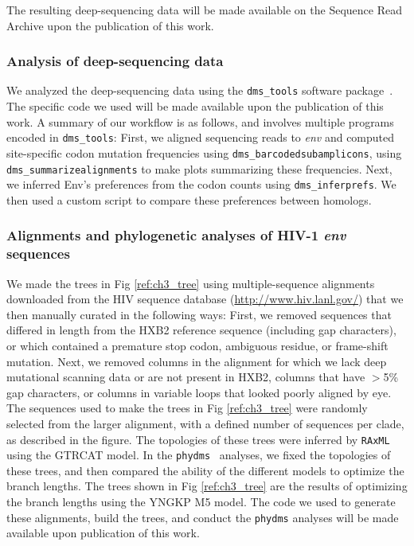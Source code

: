 \documentclass[9pt]{elife}
\begin{document}
The resulting deep-sequencing data will be made available on the Sequence Read Archive upon the publication of this work.

\subsubsection*{Analysis of deep-sequencing data}

We analyzed the deep-sequencing data using the \texttt{dms\_tools} software package~\cite{bloom2015software}.
The specific code we used will be made available upon the publication of this work.
A summary of our workflow is as follows, and involves multiple programs encoded in \texttt{dms\_tools}:
First, we aligned sequencing reads to \textit{env} and computed site-specific codon mutation frequencies using \texttt{dms\_barcodedsubamplicons}, using \texttt{dms\_summarizealignments} to make plots summarizing these frequencies.
Next, we inferred Env's preferences from the codon counts using \texttt{dms\_inferprefs}.
We then used a custom script to compare these preferences between homologs.

\subsubsection*{Alignments and phylogenetic analyses of HIV-1 {\it env} sequences}
We made the trees in Fig \ref{ref:ch3_tree} using multiple-sequence alignments downloaded from the HIV sequence database (\url{http://www.hiv.lanl.gov/}) that we then manually curated in the following ways:
First, we removed sequences that differed in length from the HXB2 reference sequence (including gap characters), or which contained a premature stop codon, ambiguous residue, or frame-shift mutation.
Next, we removed columns in the alignment for which we lack deep mutational scanning data or are not present in HXB2, columns that have $>$5\% gap characters, or columns in variable loops that looked poorly aligned by eye.
The sequences used to make the trees in Fig \ref{ref:ch3_tree} were randomly selected from the larger alignment, with a defined number of sequences per clade, as described in the figure.
The topologies of these trees were inferred by \texttt{RAxML} using the GTRCAT model.
In the \texttt{phydms}~\cite{hilton2017phydms} analyses, we fixed the topologies of these trees, and then compared the ability of the different models to optimize the branch lengths.
The trees shown in Fig \ref{ref:ch3_tree} are the results of optimizing the branch lengths using the YNGKP M5 model.
The code we used to generate these alignments, build the trees, and conduct the \texttt{phydms} analyses will be made available upon publication of this work.
\end{document}
